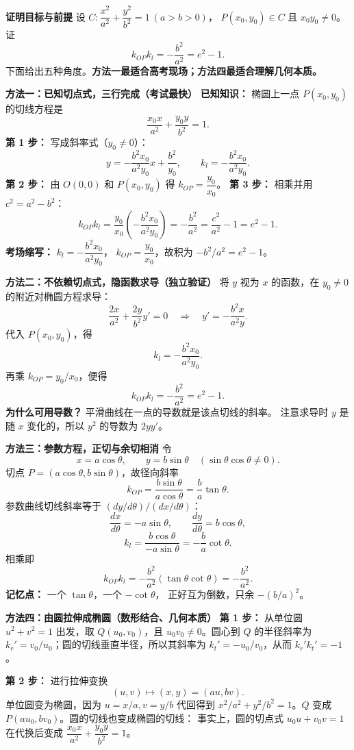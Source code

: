 \begin{proofbox}
\textbf{\textcolor{CProof}{证明目标与前提}}
设 $C:\dfrac{x^2}{a^2}+\dfrac{y^2}{b^2}=1\ (a>b>0)$，
$P(x_0,y_0)\in C$ 且 $x_0y_0\ne0$。证
\[
     k_{OP}k_l=-\frac{b^2}{a^2}=e^2-1.
\]
下面给出五种角度。\textbf{方法一最适合高考现场；方法四最适合理解几何本质。}

\medskip
\textbf{\textcolor{CProof}{方法一：已知切点式，三行完成（考试最快）}}
\textbf{已知知识：} 椭圆上一点 $P(x_0,y_0)$ 的切线方程是
\[
      \frac{x_0x}{a^2}+\frac{y_0y}{b^2}=1.
\]
\textbf{第 1 步：} 写成斜率式（$y_0\ne0$）：
\[
 y=-\frac{b^2x_0}{a^2y_0}x+\frac{b^2}{y_0},
 \qquad k_l=-\frac{b^2x_0}{a^2y_0}.
\]
\textbf{第 2 步：} 由 $O(0,0)$ 和 $P(x_0,y_0)$ 得
$k_{OP}=\dfrac{y_0}{x_0}$。
\textbf{第 3 步：} 相乘并用 $c^2=a^2-b^2$：
\[
 \boxed{k_{OP}k_l
 =\frac{y_0}{x_0}\left(-\frac{b^2x_0}{a^2y_0}\right)
 =-\frac{b^2}{a^2}=\frac{c^2}{a^2}-1=e^2-1.}
\]
\textbf{考场缩写：} $k_l=-\dfrac{b^2x_0}{a^2y_0}$，
$k_{OP}=\dfrac{y_0}{x_0}$，故积为 $-b^2/a^2=e^2-1$。

\medskip
\textbf{\textcolor{CProof}{方法二：不依赖切点式，隐函数求导（独立验证）}}
将 $y$ 视为 $x$ 的函数，在 $y_0\ne0$ 的附近对椭圆方程求导：
\[
 \frac{2x}{a^2}+\frac{2y}{b^2}y'=0
 \quad\Longrightarrow\quad
 y'=-\frac{b^2x}{a^2y}.
\]
代入 $P(x_0,y_0)$，得
\[
 k_l=-\frac{b^2x_0}{a^2y_0}.
\]
再乘 $k_{OP}=y_0/x_0$，便得
\[
 k_{OP}k_l=-\frac{b^2}{a^2}=e^2-1.
\]
\textbf{为什么可用导数？} 平滑曲线在一点的导数就是该点切线的斜率。
注意求导时 $y$ 是随 $x$ 变化的，所以 $y^2$ 的导数为 $2yy'$。

\medskip
\textbf{\textcolor{CProof}{方法三：参数方程，正切与余切相消}}
令
\[
 x=a\cos\theta,\qquad y=b\sin\theta
 \quad (\sin\theta\cos\theta\ne0).
\]
切点 $P=(a\cos\theta,b\sin\theta)$，故径向斜率
\[
 k_{OP}=\frac{b\sin\theta}{a\cos\theta}
        =\frac ba\tan\theta.
\]
参数曲线切线斜率等于 $(dy/d\theta)/(dx/d\theta)$：
\[
 \frac{dx}{d\theta}=-a\sin\theta,\qquad
 \frac{dy}{d\theta}=b\cos\theta,
\]
\[
 k_l=\frac{b\cos\theta}{-a\sin\theta}
       =-\frac ba\cot\theta.
\]
相乘即
\[
 k_{OP}k_l=-\frac{b^2}{a^2}
 (\tan\theta\cot\theta)=-\frac{b^2}{a^2}.
\]
\textbf{记忆点：} 一个 $\tan\theta$，一个 $-\cot\theta$，
正好互为倒数，只余 $-(b/a)^2$。

\medskip
\textbf{\textcolor{CProof}{方法四：由圆拉伸成椭圆（数形结合、几何本质）}}
\textbf{第 1 步：} 从单位圆 $u^2+v^2=1$ 出发，取
$Q(u_0,v_0)$，且 $u_0v_0\ne0$。圆心到 $Q$ 的半径斜率为
$k_r'=v_0/u_0$；圆的切线垂直半径，所以其斜率为
$k_t'=-u_0/v_0$，从而 $k_r'k_t'=-1$。

\textbf{第 2 步：} 进行拉伸变换
\[
       (u,v)\longmapsto(x,y)=(au,bv).
\]
单位圆变为椭圆，因为 $u=x/a,v=y/b$ 代回得到
$x^2/a^2+y^2/b^2=1$。$Q$ 变成
$P(au_0,bv_0)$。圆的切线也变成椭圆的切线：
事实上，圆的切点式 $u_0u+v_0v=1$ 在代换后变成
$\dfrac{x_0x}{a^2}+\dfrac{y_0y}{b^2}=1$。


\end{proofbox}

